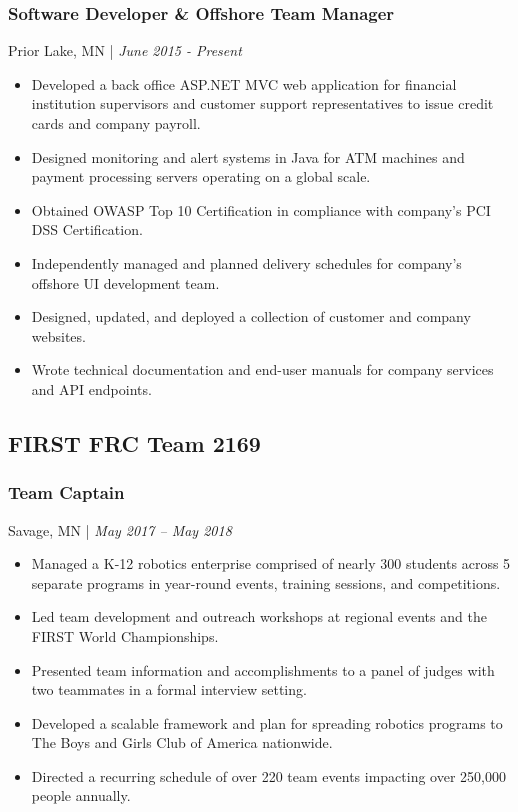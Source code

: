 \documentclass{article}
\begin{document}
\subsubsection{Software Developer \& Offshore Team Manager}
Prior Lake, MN | \textit{June 2015 - Present}
\begin{itemize}[leftmargin=*]
\item Developed a back office ASP.NET MVC web application for financial institution supervisors and customer support representatives to issue credit cards and company payroll.
\item Designed monitoring and alert systems in Java for ATM machines and payment processing servers operating on a global scale.
\item Obtained OWASP Top 10 Certification in compliance with company’s PCI DSS Certification.
\item Independently managed and planned delivery schedules for company’s offshore UI development team.
\item Designed, updated, and deployed a collection of customer and company websites.
\item Wrote technical documentation and end-user manuals for company services and API endpoints.
\end{itemize}
\subsection{FIRST FRC Team 2169}
\subsubsection{Team Captain}
Savage, MN | \textit{May 2017 – May 2018}
\begin{itemize}[leftmargin=*]
\item Managed a K-12 robotics enterprise comprised of nearly 300 students across 5 separate programs in year-round events, training sessions, and competitions.
\item Led team development and outreach workshops at regional events and the FIRST World Championships.
\item Presented team information and accomplishments to a panel of judges with two teammates in a formal interview setting.
\item Developed a scalable framework and plan for spreading robotics programs to The Boys and Girls Club of America nationwide.
\item Directed a recurring schedule of over 220 team events impacting over 250,000 people annually.    
\end{itemize}
\end{document}
